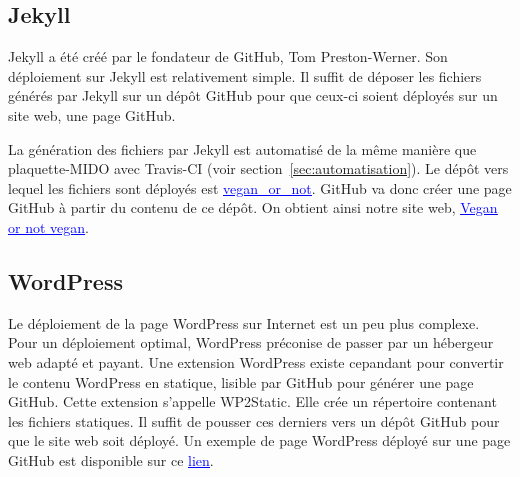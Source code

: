 \subsection{Jekyll}
Jekyll a été créé par le fondateur de GitHub, Tom Preston-Werner. Son déploiement sur Jekyll est relativement simple. Il suffit de déposer les fichiers générés par Jekyll sur un dépôt GitHub pour que ceux-ci soient déployés sur un site web, une page GitHub.

La génération des fichiers par Jekyll est automatisé de la même manière que plaquette-MIDO avec Travis-CI (voir section~\ref{sec:automatisation}). Le dépôt vers lequel les fichiers sont déployés est \href{https://github.com/barnabegeffroy/vegan_or_not}{\textcolor{blue}{\underline{vegan\_or\_not}}}. GitHub va donc créer une page GitHub à partir du contenu de ce dépôt. On obtient ainsi notre site web, \href{https://barnabegeffroy.github.io/vegan_or_not/}{\textcolor{blue}{\underline{Vegan or not vegan}}}.

\subsection{WordPress}
Le déploiement de la page WordPress sur Internet est un peu plus complexe. Pour un déploiement optimal, WordPress préconise de passer par un hébergeur web adapté et payant. Une extension WordPress existe cepandant pour convertir le contenu WordPress en statique, lisible par GitHub pour générer une page GitHub. Cette extension s'appelle WP2Static. Elle crée un répertoire contenant les fichiers statiques. Il suffit de pousser ces derniers vers un dépôt GitHub pour que le site web soit déployé. Un exemple de page WordPress déployé sur une page GitHub est disponible sur ce \href{https://barnabegeffroy.github.io/static-wp/}{\textcolor{blue}{\underline{lien}}}.